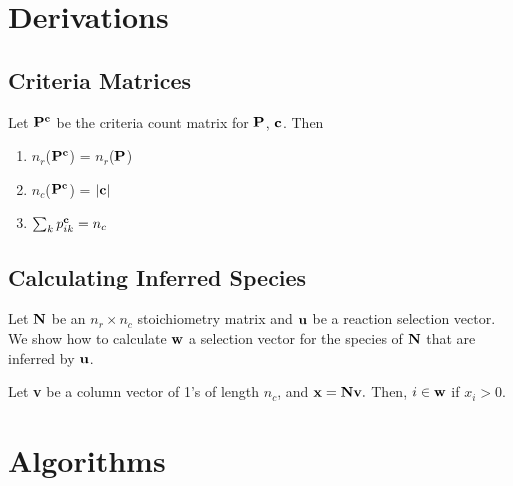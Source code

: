 \documentclass{article}
\newcommand{\mat}[1]{${\bf #1}$} %
\newcommand{\cmat}[1]{${\bf #1}^{\bf c}$} %
\begin{document}
\section{Derivations}

\subsection{Criteria Matrices}
Let \cmat{P} be the criteria count matrix for \mat{P}, \mat{c}. Then
\begin{enumerate}
\item $n_r$(\cmat{P}) = $n_r$(\mat{P})
\item $n_c$(\cmat{P}) = $|{\bf c}|$
\item $\sum_k p^{\bf c}_{ik} = n_c$
\end{enumerate}

\subsection{Calculating Inferred Species}
Let ${\bf N}$ be an $n_r \times n_c$ stoichiometry matrix and ${\bf u}$ be a reaction selection vector. We show how to calculate ${\bf w}$ a selection vector for the species of ${\bf N}$ that
are inferred by ${\bf u}$.

Let {\bf v} be a column vector of 1's of length $n_c$, and
 ${\bf x} = {\bf N} {\bf v}.$
Then, $i \in {\bf w}$ if $x_i > 0.$ 


\section{Algorithms}
\end{document}
